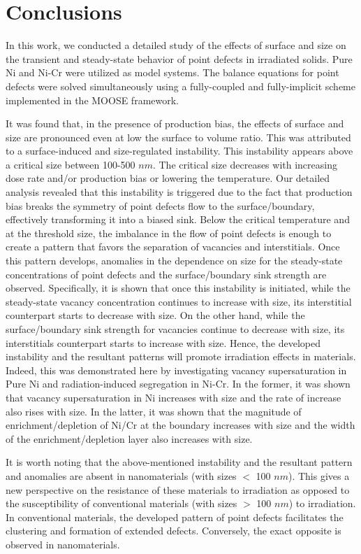 \documentclass[utf8]{frontiersSCNS} %
\begin{document}
\clearpage
\section{Conclusions}

In this work, we conducted a detailed study of the effects of surface and size on the transient and steady-state behavior of point defects in irradiated solids. Pure Ni and Ni-Cr were utilized as model systems. The balance equations for point defects were solved simultaneously using a fully-coupled and fully-implicit scheme implemented in the MOOSE framework.    

It was found that, in the presence of production bias, the effects of surface and size are pronounced even at low the surface to volume ratio. This was attributed to a surface-induced and size-regulated instability. This instability appears above a critical size between 100-500 $nm$. The critical size decreases with increasing dose rate and/or production bias or lowering the temperature. Our detailed analysis revealed that this instability is triggered due to the fact that production bias breaks the symmetry of point defects flow to the surface/boundary, effectively transforming it into a biased sink. Below the critical temperature and at the threshold size, the imbalance in the flow of point defects is enough to create a pattern that favors the separation of vacancies and interstitials. Once this pattern develops, anomalies in the dependence on size for the steady-state concentrations of point defects and the surface/boundary sink strength are observed. Specifically, it is shown that once this instability is initiated, while the steady-state vacancy concentration continues to increase with size, its interstitial counterpart starts to decrease with size. On the other hand, while the surface/boundary sink strength for vacancies continue to decrease with size, its interstitials counterpart starts to increase with size. Hence, the developed instability and the resultant patterns will promote irradiation effects in materials. Indeed, this was demonstrated here by investigating vacancy supersaturation in Pure Ni and radiation-induced segregation in Ni-Cr. In the former, it was shown that vacancy supersaturation in Ni increases with size and the rate of increase also rises with size. In the latter, it was shown that the magnitude of enrichment/depletion of Ni/Cr at the boundary increases with size and the width of the enrichment/depletion layer also increases with size.

It is worth noting that the above-mentioned instability and the resultant pattern and anomalies are absent in nanomaterials (with sizes $<$ 100 $nm$). This gives a new perspective on the resistance of these materials to irradiation as opposed to the susceptibility of conventional materials (with sizes $>$ 100 $nm$) to irradiation. In conventional materials, the developed pattern of point defects facilitates the clustering and formation of extended defects. Conversely, the exact opposite is observed in nanomaterials.
\end{document}
